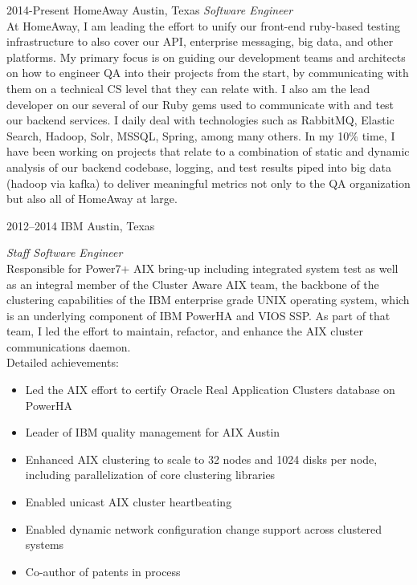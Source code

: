 \documentclass['print']{friggeri-cv} %
\begin{document}
\begin{entrylist}
\entry
{2014-Present}
{HomeAway}
{Austin, Texas}
{\emph{Software Engineer} \\
At HomeAway, I am leading the effort to unify our front-end ruby-based testing infrastructure to also cover our API, enterprise messaging, big data, and other platforms. My primary focus is on guiding our development teams and architects on how to engineer QA into their projects from the start, by communicating with them on a technical CS level that they can relate with. I also am the lead developer on our several of our Ruby gems used to communicate with and test our backend services. I daily deal with technologies such as RabbitMQ, Elastic Search, Hadoop, Solr, MSSQL, Spring, among many others.
\newline
\newline
In my 10\% time, I have been working on projects that relate to a combination of static and dynamic analysis of our backend codebase, logging, and test results piped into big data (hadoop via kafka) to deliver meaningful metrics not only to the QA organization but also all of HomeAway at large. }
\end{entrylist}
\begin{entrylist}
\entry
{2012--2014}
{IBM}
{Austin, Texas}
{\emph{Staff Software Engineer} \\
Responsible for Power7+ AIX bring-up including integrated system test as well as an integral member of the
Cluster Aware AIX team, the backbone of the clustering capabilities of the IBM enterprise grade UNIX operating system,
which is an underlying component of IBM PowerHA and VIOS SSP. As part of that team, I led the effort to maintain, refactor,
and enhance the AIX cluster communications daemon. \\
Detailed achievements:
\begin{itemize}
\item Led the AIX effort to certify Oracle Real Application Clusters database on PowerHA
\item Leader of IBM quality management for AIX Austin
\item Enhanced AIX clustering to scale to 32 nodes and 1024 disks per node, including parallelization of core clustering libraries
\item Enabled unicast AIX cluster heartbeating
\item Enabled dynamic network configuration change support across clustered systems
\item Co-author of patents in process
\end{itemize}}
\end{entrylist}
\end{document}
